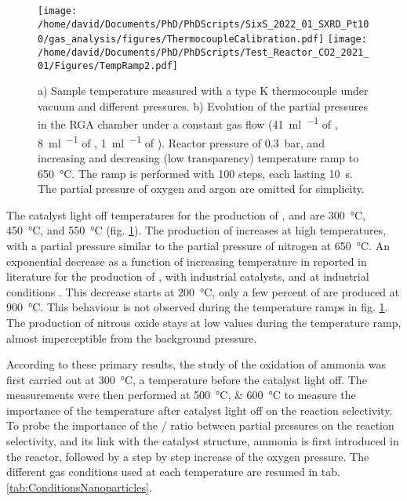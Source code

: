 \begin{figure}[!htb]
    \centering
    \texttt{[image: /home/david/Documents/PhD/PhDScripts/SixS\_2022\_01\_SXRD\_Pt100/gas\_analysis/figures/ThermocoupleCalibration.pdf]}
    \texttt{[image: /home/david/Documents/PhD/PhDScripts/Test\_Reactor\_CO2\_2021\_01/Figures/TempRamp2.pdf]}
    \caption{
        a) Sample temperature measured with a type K thermocouple under vacuum and different  pressures.
        b) Evolution of the partial pressures in the RGA chamber under a constant gas flow (\qty{41}{\ml\per\min} of , \qty{8}{\ml\per\min} of , \qty{1}{\ml\per\min} of ).
        Reactor pressure of \qty{0.3}{\bar}, and increasing and decreasing (low transparency) temperature ramp to \qty{650}{\degreeCelsius}.
        The ramp is performed with 100 steps, each lasting \qty{10}{\second}.
        The partial pressure of oxygen and argon are omitted for simplicity.
    }
    \label{fig:TempRamps}
\end{figure}

The catalyst light off temperatures for the production of ,  and  are \qty{300}{\degreeCelsius}, \qty{450}{\degreeCelsius}, and \qty{550}{\degreeCelsius} (fig. \ref{fig:TempRamps}).
The production of  increases at high temperatures, with a partial pressure similar to the partial pressure of nitrogen at \qty{650}{\degreeCelsius}.
An exponential decrease as a function of increasing temperature in reported in literature for the production of , with industrial catalysts, and at industrial conditions \parencite{Hatscher2008}.
This decrease starts at \qty{200}{\degreeCelsius}, only a few percent of  are produced at \qty{900}{\degreeCelsius}.
This behaviour is not observed during the temperature ramps in fig. \ref{fig:TempRamps}.
The production of nitrous oxide stays at low values during the temperature ramp, almost imperceptible from the background pressure.

According to these primary results, the study of the oxidation of ammonia was first carried out at \qty{300}{\degreeCelsius}, a temperature before the catalyst light off.
The measurements were then performed at \qtylist{500; 600}{\degreeCelsius} to measure the importance of the temperature after catalyst light off on the reaction selectivity.
To probe the importance of the / ratio between partial pressures on the reaction selectivity, and its link with the catalyst structure, ammonia is first introduced in the reactor, followed by a step by step increase of the oxygen pressure.
The different gas conditions used at each temperature are resumed in tab. \ref{tab:ConditionsNanoparticles}.

